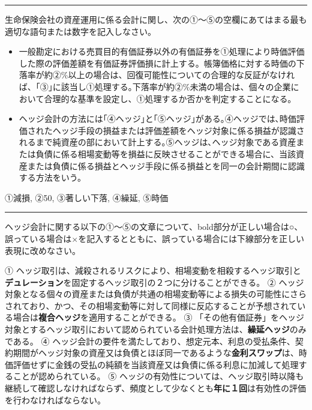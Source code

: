 \documentclass[report,gutter=10mm,fore-edge=10mm,uplatex,dvipdfmx]{jlreq}
\begin{document}
\begin{center}\rule{0.5\linewidth}{0.5pt}\end{center}


生命保険会社の資産運用に係る会計に関し、次の①～⑤の空欄にあてはまる最も適切な語句または数字を記入しなさい。

\begin{itemize}
\item 一般勘定における売買目的有価証券以外の有価証券を①処理により時価評価した際の評価差額を有価証券評価損に計上する。帳簿価格に対する時価の下落率が約②\%以上の場合は、回復可能性についての合理的な反証がなければ、｢③｣に該当し①処理する｡下落率が約②\%未満の場合は、個々の企業において合理的な基準を設定し、①処理するか否かを判定することになる。
\item ヘッジ会計の方法には｢④ヘッジ｣と｢⑤ヘッジ｣がある｡④ヘッジでは､時価評価されたヘッジ手段の損益または評価差額をヘッジ対象に係る損益が認識されるまで純資産の部において計上する｡⑤ヘッジは､ヘッジ対象である資産または負債に係る相場変動等を損益に反映させることができる場合に、当該資産または負債に係る損益とヘッジ手段に係る損益とを同一の会計期間に認識する方法をいう。
\end{itemize}



①減損, ②50, ③著しい下落, ④繰延, ⑤時価

\begin{center}\rule{0.5\linewidth}{0.5pt}\end{center}


ヘッジ会計に関する以下の①～⑤の文章について、bold部分が正しい場合は○、誤っている場合は×を記入するとともに、誤っている場合には下線部分を正しい表現に改めなさい。

①
ヘッジ取引は、減殺されるリスクにより、相場変動を相殺するヘッジ取引と\textbf{デュレーション}を固定するヘッジ取引の２つに分けることができる。
②
ヘッジ対象となる個々の資産または負債が共通の相場変動等による損失の可能性にさらされており、かつ、その相場変動等に対して同様に反応することが予想されている場合は\textbf{複合ヘッジ}を適用することができる。
③
「その他有価証券」をヘッジ対象とするヘッジ取引において認められている会計処理方法は、\textbf{繰延ヘッジ}のみである。
④
ヘッジ会計の要件を満たしており、想定元本、利息の受払条件、契約期間がヘッジ対象の資産又は負債とほぼ同一であるような\textbf{金利スワップ}は、時価評価せずに金銭の受払の純額を当該資産又は負債に係る利息に加減して処理することが認められている。
⑤
ヘッジの有効性については、ヘッジ取引時以降も継続して確認しなければならず、頻度として少なくとも\textbf{年に１回}は有効性の評価を行わなければならない。
\end{document}
